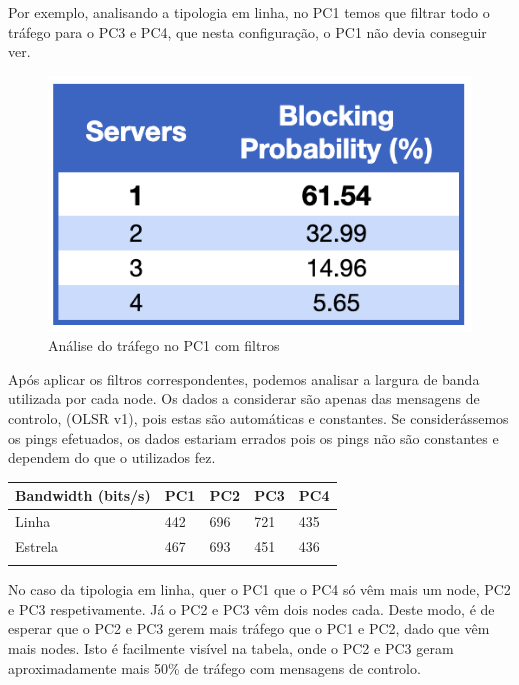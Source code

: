 Por exemplo, analisando a tipologia em linha, no PC1 temos que filtrar todo o tráfego para o PC3 e PC4, que nesta configuração,
o PC1 não devia conseguir ver.

\begin{figure}[H]
    \centering
    \includegraphics[width=\linewidth]{figs/image_2.png}
    \caption{Análise do tráfego no PC1 com filtros}
    \label{fig:2}
\end{figure}

Após aplicar os filtros correspondentes, podemos analisar a largura de banda utilizada por cada node.
Os dados a considerar são apenas das mensagens de controlo, (OLSR v1), pois estas são automáticas e constantes.
Se considerássemos os pings efetuados, os dados estariam errados pois os pings não são constantes e dependem do que o utilizados fez. 

\begin{center}
    \Large{
    \begin{tabular}{ | m{4.3cm} | m{2cm}| m{2cm} | m{2cm} | m{2cm} |} 
    \hline
    Bandwidth (bits/s) & PC1 & PC2 & PC3 & PC4 \\ 
    \hline
    Linha & 442 & 696 & 721 & 435\\ 
    \hline
    Estrela & 467 & 693 & 451 & 436\\ 
    \hline
    \label{tab:1}
    \end{tabular}
    }
\end{center}

No caso da tipologia em linha, quer o PC1 que o PC4 só vêm mais um node, PC2 e PC3 respetivamente. Já o PC2 e PC3 vêm dois nodes cada.
Deste modo, é de esperar que o PC2 e PC3 gerem mais tráfego que o PC1 e PC2, dado que vêm mais nodes. Isto é facilmente visível na tabela,
onde o PC2 e PC3 geram aproximadamente mais 50\% de tráfego com mensagens de controlo.


